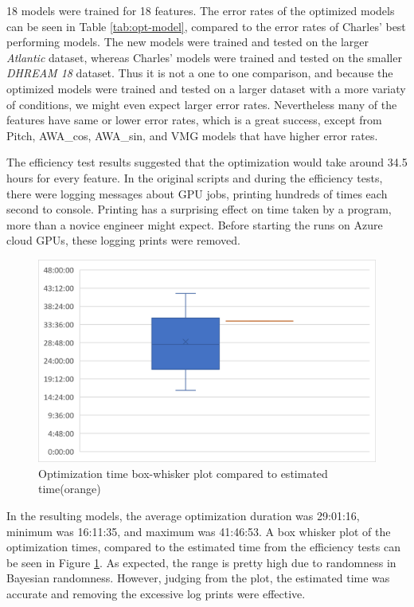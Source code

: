 \documentclass[12pt,twoside]{report}
\begin{document}
18 models were trained for 18 features. The error rates of the optimized models can be seen in Table \ref{tab:opt-model}, compared to the error rates of Charles' best performing models. The new models were trained and tested on the larger \textit{Atlantic} dataset, whereas Charles' models were trained and tested on the smaller \textit{DHREAM 18} dataset. Thus it is not a one to one comparison, and because the optimized models were trained and tested on a larger dataset with a more variaty of conditions, we might even expect larger error rates. Nevertheless many of the features have same or lower error rates, which is a great success, except from Pitch, AWA\_cos, AWA\_sin, and VMG models that have higher error rates.

The efficiency test results suggested that the optimization would take around 34.5 hours for every feature. In the original scripts and during the efficiency tests, there were logging messages about GPU jobs, printing hundreds of times each second to console. Printing has a surprising effect on time taken by a program, more than a novice engineer might expect. Before starting the runs on Azure cloud GPUs, these logging prints were removed. 

\begin{figure}[h]
\centering
\includegraphics[width = 0.8\hsize]{figures/Contribution/Opt-time-box-whisker.png}
\caption{Optimization time box-whisker plot compared to estimated time(orange)}
\label{fig:opt-time}
\end{figure}

In the resulting models, the average optimization duration was 29:01:16, minimum was 16:11:35, and maximum was 41:46:53. A box whisker plot of the optimization times, compared to the estimated time from the efficiency tests can be seen in Figure \ref{fig:opt-time}. As expected, the range is pretty high due to randomness in Bayesian randomness. However, judging from the plot, the estimated time was accurate and removing the excessive log prints were effective.
\end{document}
